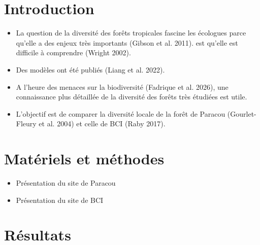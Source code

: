 \documentclass[
  french,
  11pt,
]{stylisharticle}
\affiliation{%
      \textsuperscript{1}%
      Université de Montpellier%
      , BioGET%
      , Somewhere%
      , Montpellier%
      , 34090%
    }
\providecommand{\tightlist}{%
  \setlength{\itemsep}{0pt}\setlength{\parskip}{0pt}}
\begin{document}
\flushbottom

\maketitle

\tableofcontents

\thispagestyle{empty}

\section{Introduction}\label{introduction}

\begin{itemize}
\tightlist
\item
  La question de la diversité des forêts tropicales fascine les
  écologues parce qu'elle a des enjeux très importants ({Gibson et al.}
  2011). est qu'elle est difficile à comprendre (Wright 2002).
\item
  Des modèles ont été publiés ({Liang et al.} 2022).
\item
  A l'heure des menaces sur la biodiversité ({Fadrique et al.} 2026),
  une connaissance plus détaillée de la diversité des forêts très
  étudiées est utile.
\item
  L'objectif est de comparer la diversité locale de la forêt de Paracou
  (Gourlet-Fleury et al. 2004) et celle de BCI (Raby 2017).
\end{itemize}

\section{Matériels et méthodes}\label{matuxe9riels-et-muxe9thodes}

\begin{itemize}
\tightlist
\item
  Présentation du site de Paracou
\end{itemize}

\begin{itemize}
\tightlist
\item
  Présentation du site de BCI
\end{itemize}

\section{Résultats}\label{ruxe9sultats}
\end{document}
